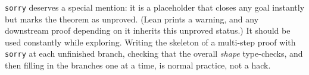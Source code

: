 \texttt{sorry} deserves a special mention: it is a placeholder that closes any goal instantly but marks the theorem as unproved. (Lean prints a warning, and any downstream proof depending on it inherits this unproved status.) It should be used constantly while exploring. Writing the skeleton of a multi-step proof with \texttt{sorry} at each unfinished branch, checking that the overall \emph{shape} type-checks, and then filling in the branches one at a time, is normal practice, not a hack.
